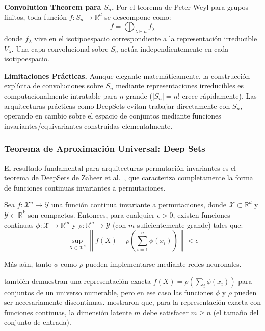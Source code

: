 \textbf{Convolution Theorem para $S_n$.}\label{rem:convolution_sn} Por el teorema de Peter-Weyl para grupos finitos, toda función $f: S_n \to \mathbb{R}^d$ se descompone como:
\begin{equation}
f = \bigoplus_{\lambda \vdash n} f_\lambda
\end{equation}
donde $f_\lambda$ vive en el isotipoespacio correspondiente a la representación irreducible $V_\lambda$. Una capa convolucional sobre $S_n$ actúa independientemente en cada isotipoespacio.

\textbf{Limitaciones Prácticas.} Aunque elegante matemáticamente, la construcción explícita de convoluciones sobre $S_n$ mediante representaciones irreducibles es computacionalmente intratable para $n$ grande ($|S_n| = n!$ crece rápidamente). Las arquitecturas prácticas como DeepSets evitan trabajar directamente con $S_n$, operando en cambio sobre el espacio de conjuntos mediante funciones invariantes/equivariantes construidas elementalmente.

\subsubsection{Teorema de Aproximación Universal: Deep Sets}

El resultado fundamental para arquitecturas permutación-invariantes es el teorema de DeepSets de Zaheer et al.~\citep{zaheer2017deepsets}, que caracteriza completamente la forma de funciones continuas invariantes a permutaciones.

\begin{theorem}\label{thm:deepsets_universal}
Sea $f: \mathcal{X}^n \to \mathcal{Y}$ una función continua invariante a permutaciones, donde $\mathcal{X} \subset \mathbb{R}^d$ y $\mathcal{Y} \subset \mathbb{R}^k$ son compactos. Entonces, para cualquier $\epsilon > 0$, existen funciones continuas $\phi: \mathcal{X} \to \mathbb{R}^m$ y $\rho: \mathbb{R}^m \to \mathcal{Y}$ (con $m$ suficientemente grande) tales que:
\begin{equation}
\sup_{X \in \mathcal{X}^n} \left\|f(X) - \rho\left(\sum_{i=1}^n \phi(x_i)\right)\right\| < \epsilon
\label{eq:deepsets_representation}
\end{equation}

Más aún, tanto $\phi$ como $\rho$ pueden implementarse mediante redes neuronales.
\end{theorem}

\begin{remark}
\citet{zaheer2017deepsets} también demuestran una representación exacta $f(X) = \rho(\sum_i \phi(x_i))$ para conjuntos de un universo numerable, pero en ese caso las funciones $\phi$ y $\rho$ pueden ser necesariamente discontinuas. \citet{wagstaff2019limitations} mostraron que, para la representación exacta con funciones continuas, la dimensión latente $m$ debe satisfacer $m \geq n$ (el tamaño del conjunto de entrada).
\end{remark}

